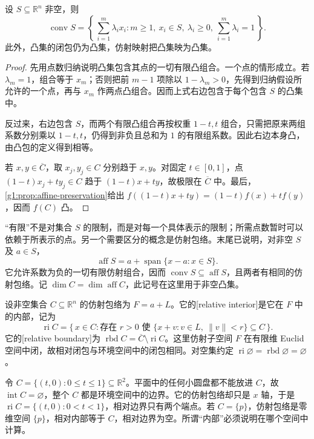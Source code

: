 \begin{proposition}\label{g1:prop:convex-finite-combinations}
	设 \(S\subseteq\mathbb R^n\) 非空，则
	\[
		\operatorname{conv}S=\left\{\,\sum_{i=1}^m\lambda_i x_i:m\geq1,\ x_i\in S,\ \lambda_i\geq0,\ \sum_{i=1}^m\lambda_i=1\,\right\}.
	\]
	此外，凸集的闭包仍为凸集，仿射映射把凸集映为凸集。
\end{proposition}
\begin{proof}
	先用点数归纳说明凸集包含其点的一切有限凸组合。一个点的情形成立。若 \(\lambda_m=1\)，组合等于 \(x_m\)；否则把前 \(m-1\) 项除以 \(1-\lambda_m>0\)，先得到归纳假设所允许的一个点，再与 \(x_m\) 作两点凸组合。因而上式右边包含于每个包含 \(S\) 的凸集中。

	反过来，右边包含 \(S\)，而两个有限凸组合再按权重 \(1-t,t\) 组合，只需把原来两组系数分别乘以 \(1-t,t\)，仍得到非负且总和为 \(1\) 的有限组系数。因此右边本身凸，由凸包的定义得到相等。

	若 \(x,y\in\overline C\)，取 \(x_j,y_j\in C\) 分别趋于 \(x,y\)。对固定 \(t\in[0,1]\)，点 \((1-t)x_j+ty_j\in C\) 趋于 \((1-t)x+ty\)，故极限在 \(\overline C\) 中。最后，\cref{g1:prop:affine-preservation}给出 \(f((1-t)x+ty)=(1-t)f(x)+tf(y)\)，因而 \(f(C)\) 凸。
\end{proof}

“有限”不是对集合 \(S\) 的限制，而是对每一个具体表示的限制；所需点数暂时可以依赖于所表示的点。另一个需要区分的概念是仿射包络。末尾已说明，对非空 \(S\) 及 \(a\in S\)，
\[
	\operatorname{aff}S=a+\operatorname{span}\{x-a:x\in S\}.
\]
它允许系数为负的一切有限仿射组合，因而 \(\operatorname{conv}S\subseteq\operatorname{aff}S\)，且两者有相同的仿射包络。记 \(\dim C=\dim\operatorname{aff}C\)，此记号在这里用于非空凸集。

\begin{definition}\label{g1:def:relative-interior}
	设非空集合 \(C\subseteq\mathbb R^n\) 的仿射包络为 \(F=a+L\)。它的[relative interior]是它在 \(F\) 中的内部，记为
	\[
		\operatorname{ri}C=\{\,x\in C:\text{存在 }r>0\text{ 使 }\{x+v:v\in L,\ \lVert v\rVert<r\}\subseteq C\,\}.
	\]
	它的[relative boundary]为 \(\operatorname{rbd}C=\overline C\setminus\operatorname{ri}C\)。这里仿射子空间 \(F\) 在有限维 Euclid 空间中闭，故相对闭包与环境空间中的闭包相同。对空集约定 \(\operatorname{ri}\varnothing=\operatorname{rbd}\varnothing=\varnothing\)。
\end{definition}

\begin{example}\label{g1:exm:relative-segment}
	令 \(C=\{(t,0):0\leq t\leq1\}\subseteq\mathbb R^2\)。平面中的任何小圆盘都不能放进 \(C\)，故 \(\operatorname{int}C=\varnothing\)，整个 \(C\) 都是环境空间中的边界。它的仿射包络却只是 \(x\) 轴，于是 \(\operatorname{ri}C=\{(t,0):0<t<1\}\)，相对边界只有两个端点。若 \(C=\{p\}\)，仿射包络是零维空间 \(\{p\}\)，相对内部等于 \(C\)，相对边界为空。所谓“内部”必须说明在哪个空间中计算。
\end{example}

